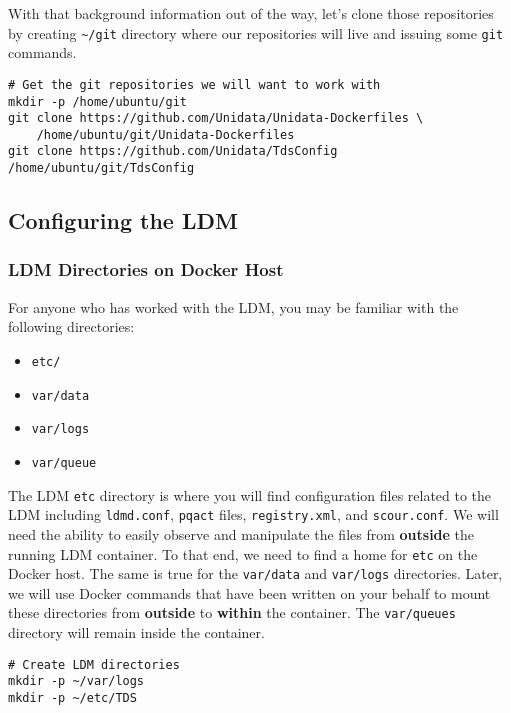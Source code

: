 \documentclass[onecolumn,9pt]{article}
\begin{document}
With that background information out of the way, let's clone those repositories by creating \texttt{\textasciitilde{}/git} directory where our repositories will live and issuing some \texttt{git} commands.

\begin{verbatim}
# Get the git repositories we will want to work with
mkdir -p /home/ubuntu/git
git clone https://github.com/Unidata/Unidata-Dockerfiles \
    /home/ubuntu/git/Unidata-Dockerfiles
git clone https://github.com/Unidata/TdsConfig /home/ubuntu/git/TdsConfig
\end{verbatim}

\subsection{Configuring the LDM}
\label{sec:orgheadline26}
\subsubsection{LDM Directories on Docker Host}
\label{sec:orgheadline18}

For anyone who has worked with the LDM, you may be familiar with the following directories:

\begin{itemize}
\item \texttt{etc/}
\item \texttt{var/data}
\item \texttt{var/logs}
\item \texttt{var/queue}
\end{itemize}

The LDM \texttt{etc} directory is where you will find configuration files related to the LDM including \texttt{ldmd.conf}, \texttt{pqact} files, \texttt{registry.xml}, and  \texttt{scour.conf}. We will need the ability to easily observe and manipulate the files from \textbf{outside} the running LDM container. To that end, we need to find a home for \texttt{etc} on the Docker host. The same is true for the \texttt{var/data} and \texttt{var/logs} directories. Later, we will use Docker commands that have been written on your behalf to mount these directories from \textbf{outside} to \textbf{within} the container. The \texttt{var/queues} directory will remain inside the container.

\begin{verbatim}
# Create LDM directories
mkdir -p ~/var/logs 
mkdir -p ~/etc/TDS
\end{verbatim}
\end{document}
